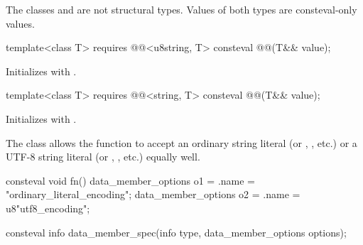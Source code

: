 \pnum
The classes 
and 
are not structural types.
Values of both types are consteval-only values.

\begin{itemdecl}
template<class T>
  requires @@<u8string, T>
  consteval @@(T&& value);
\end{itemdecl}

\begin{itemdescr}
\pnum
\effects
Initializes 
with .
\end{itemdescr}

\begin{itemdecl}
template<class T>
  requires @@<string, T>
  consteval @@(T&& value);
\end{itemdecl}

\begin{itemdescr}
\pnum
\effects
Initializes 
with .
\begin{note}
The class  allows
the function  to accept
an ordinary string literal (or , , etc.)
or a UTF-8 string literal (or , , etc.)
equally well.
\begin{example}
\begin{codeblock}
consteval void fn() {
  data_member_options o1 = {.name = "ordinary_literal_encoding"};
  data_member_options o2 = {.name = u8"utf8_encoding"};
}
\end{codeblock}
\end{example}
\end{note}
\end{itemdescr}

%
\begin{itemdecl}
consteval info data_member_spec(info type, data_member_options options);
\end{itemdecl}

